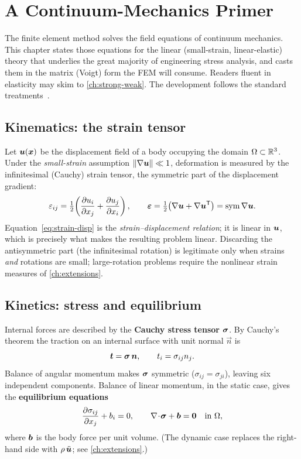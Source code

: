 \chapter{A Continuum-Mechanics Primer}
\label{ch:continuum}

The finite element method solves the field equations of continuum
mechanics. This chapter states those equations for the linear
(small-strain, linear-elastic) theory that underlies the great majority
of engineering stress analysis, and casts them in the matrix (Voigt)
form the FEM will consume. Readers fluent in elasticity may skim to
\cref{ch:strong-weak}. The development follows the standard
treatments~\citep{malvern1969,hughes2000,bathe2014}.

\section{Kinematics: the strain tensor}

Let $\bm{u}(\bm{x})$ be the displacement field of a body occupying the
domain $\Omega\subset\mathbb R^3$. Under the \emph{small-strain}
assumption $\lVert\nabla\bm{u}\rVert\ll 1$, deformation is measured by the
infinitesimal (Cauchy) strain tensor, the symmetric part of the
displacement gradient:
\begin{equation}
  \varepsilon_{ij} = \tfrac12\!\left(\frac{\partial u_i}{\partial x_j}+\frac{\partial u_j}{\partial x_i}\right),
  \qquad
  \bm{\varepsilon} = \tfrac12\bigl(\nabla\bm{u}+\nabla\bm{u}^{\mathsf{T}}\bigr)
          = \operatorname{sym}\nabla\bm{u} .
  \label{eq:strain-disp}
\end{equation}
Equation~\eqref{eq:strain-disp} is the \emph{strain--displacement
relation}; it is linear in $\bm{u}$, which is precisely what makes the
resulting problem linear. Discarding the antisymmetric part (the
infinitesimal rotation) is legitimate only when strains \emph{and}
rotations are small; large-rotation problems require the nonlinear
strain measures of \cref{ch:extensions}.

\section{Kinetics: stress and equilibrium}

Internal forces are described by the \textbf{Cauchy stress tensor}
$\bm{\sigma}$. By Cauchy's theorem the traction on an internal surface with
unit normal $\vec n$ is
\begin{equation}
  \bm{t} = \bm{\sigma}\,\bm{n}, \qquad t_i = \sigma_{ij}n_j .
\end{equation}
Balance of angular momentum makes $\bm{\sigma}$ symmetric
($\sigma_{ij}=\sigma_{ji}$), leaving six independent components. Balance
of linear momentum, in the static case, gives the \textbf{equilibrium
equations}
\begin{equation}
  \frac{\partial \sigma_{ij}}{\partial x_j} + b_i = 0, \qquad
  \nabla\!\cdot\!\bm{\sigma} + \bm{b} = \bm{0} \quad\text{in }\Omega,
  \label{eq:equilibrium}
\end{equation}
where $\bm{b}$ is the body force per unit volume. (The dynamic case
replaces the right-hand side with $\rho\,\ddot{\bm{u}}$; see
\cref{ch:extensions}.)


